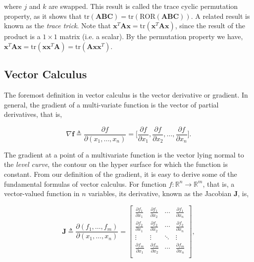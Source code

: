 \documentclass[11pt]{amsart}
\begin{document}
where $j$ and $k$ are swapped. This result is called the trace cyclic permutation property, as it shows that $\text{tr}(\mathbf{A}\mathbf{B}\mathbf{C}) = \text{tr}(\text{ROR}(\mathbf{A}\mathbf{B}\mathbf{C}))$. A related result is known as the \emph{trace trick}. Note that $\mathbf{x}^T\mathbf{A}\mathbf{x} = \text{tr}(\mathbf{x}^T\mathbf{A}\mathbf{x})$, since the result of the product is a $1 \times 1$ matrix (i.e. a scalar). By the permutation property we have, $\mathbf{x}^T\mathbf{A}\mathbf{x} = \text{tr}(\mathbf{x}\mathbf{x}^T\mathbf{A}) = \text{tr}(\mathbf{A}\mathbf{x}\mathbf{x}^T)$.

\subsection{Vector Calculus}

The foremost definition in vector calculus is the vector derivative or gradient. In general, the gradient of a multi-variate function is the vector of partial derivatives, that is,

$$\nabla\mathbf{f} \triangleq \frac{\partial f}{\partial(x_1, \dots, x_n)} = \bigg[\frac{\partial f}{\partial x_{1}}, \frac{\partial f}{\partial x_{2}}, \dots, \frac{\partial f}{\partial x_{n}}\bigg].$$

The gradient at a point of a multivariate function is the vector lying normal to the \emph{level curve}, the contour on the hyper surface for which the function is constant. From our definition of the gradient, it is easy to derive some of the fundamental formulas of vector calculus. For function $f : \mathbb{R}^{n} \to \mathbb{R}^{m}$, that is, a vector-valued function in $n$ variables, its derivative, known as the Jacobian $\mathbf{J}$, is,

$$\mathbf{J} \triangleq \frac{\partial (f_1, \dots, f_m)}{\partial(x_1, \dots, x_n)} = \begin{bmatrix}
\frac{\partial f_1}{\partial x_{1}}&\frac{\partial f_1}{\partial x_{2}}&\cdots&\frac{\partial f_1}{\partial x_{n}}\\
\frac{\partial f_2}{\partial x_{1}}&\frac{\partial f_2}{\partial x_{2}}&\cdots&\frac{\partial f_2}{\partial x_{n}}\\
\vdots & \vdots & \ddots & \vdots \\
\frac{\partial f_m}{\partial x_{1}}&\frac{\partial f_m}{\partial x_{2}}&\cdots&\frac{\partial f_m}{\partial x_{n}}\\
\end{bmatrix},$$
\end{document}
